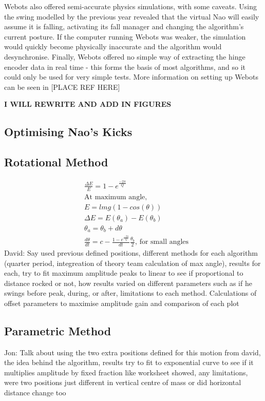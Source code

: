 \documentclass[11pt]{article}
\newcommand*\ruleline[1]{\par\noindent\raisebox{.8ex}{\makebox[\linewidth]{\hrulefill\hspace{1ex}\raisebox{-.8ex}{#1}\hspace{1ex}\hrulefill}}}
\begin{document}
Webots also offered semi-accurate physics simulations, with some caveats. Using the swing modelled by the previous year revealed that the virtual Nao will easily assume it is falling, activating its fall manager and changing the algorithm's current posture. If the computer running Webots was weaker, the simulation would quickly become physically inaccurate and the algorithm would desynchronise. Finally, Webots offered no simple way of extracting the hinge encoder data in real time - this forms the basis of most algorithms, and so it could only be used for very simple tests. More information on setting up Webots can be seen in [PLACE REF HERE]

\textbf{I WILL REWRITE AND ADD IN FIGURES}



\subsection{Optimising Nao's Kicks}
\ruleline{David Thomas}

\subsection{Rotational Method}
\ruleline{David Thomas}
\begin{align}
    &\frac{\Delta E}{E} = 1 - e^{\frac{-2\pi}{Q}}\\
    &\text{At maximum angle},\\
    &E = lmg(1-cos(\theta))\\
    &\Delta E = E(\theta_a) - E(\theta_b)\\
    &\theta_a = \theta_b + d\theta\\
    &\frac{d\theta}{dt} = c - \frac{1-e^{\frac{-2\pi}{Q}}}{dt}\frac{\theta_b}{2}, \, \text{for small angles}
\end{align}
David: Say used previous defined positions, different methods for each algorithm (quarter period, integreation of theory team calculation of max angle), results for each, try to fit maximum amplitude peaks to linear to see if proportional to distance rocked or not, how results varied on different parameters such as if he swings before peak, during, or after, limitations to each method.
Calculations of offset parameters to maximise amplitude gain and comparison of each plot

\subsection{Parametric Method}
Jon: Talk about using the two extra positions defined for this motion from david, the idea behind the algorithm, results try to fit to exponential curve to see if it multiplies amplitude by fixed fraction like worksheet showed, any limitations, were two positions just different in vertical centre of mass or did horizontal distance change too
\end{document}
